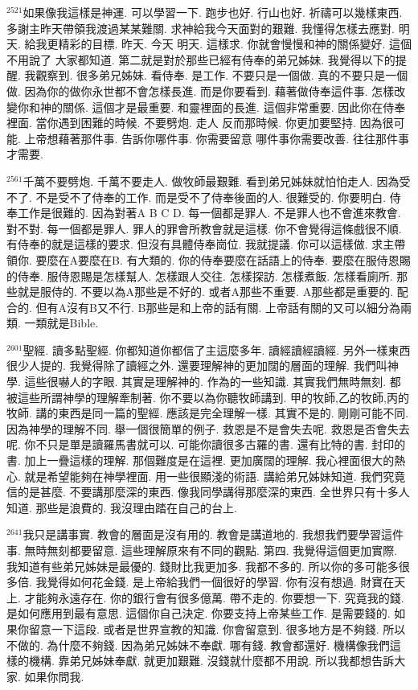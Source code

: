 \documentclass{book}
\begin{document}
$^{2521}$如果像我這樣是神運.
可以學習一下.
跑步也好.
行山也好.
祈禱可以幾樣東西.
多謝主昨天帶領我渡過某某難關.
求神給我今天面對的艱難.
我懂得怎樣去應對.
明天.
給我更精彩的目標.
昨天.
今天 明天.
這樣求.
你就會慢慢和神的關係變好.
這個不用說了 大家都知道.
第二就是對於那些已經有侍奉的弟兄姊妹.
我覺得以下的提醒.
我觀察到.
很多弟兄姊妹.
看侍奉.
是工作.
不要只是一個做.
真的不要只是一個做.
因為你的做你永世都不會怎樣長進.
而是你要看到.
藉著做侍奉這件事.
怎樣改變你和神的關係.
這個才是最重要.
和靈裡面的長進.
這個非常重要.
因此你在侍奉裡面.
當你遇到困難的時候.
不要劈炮.
走人 反而那時候.
你更加要堅持.
因為很可能.
上帝想藉著那件事.
告訴你哪件事.
你需要留意 哪件事你需要改善.
往往那件事才需要.

$^{2561}$千萬不要劈炮.
千萬不要走人.
做牧師最艱難.
看到弟兄姊妹就怕怕走人.
因為受不了.
不是受不了侍奉的工作.
而是受不了侍奉後面的人.
很難受的.
你要明白.
侍奉工作是很難的.
因為對著A B C D.
每一個都是罪人.
不是罪人也不會進來教會.
對不對.
每一個都是罪人.
罪人的罪會所教會就是這樣.
你不會覺得這條戲很不順.
有侍奉的就是這樣的要求.
但沒有具體侍奉崗位.
我就提議.
你可以這樣做.
求主帶領你.
要麼在A要麼在B.
有大類的.
你的侍奉要麼在話語上的侍奉.
要麼在服侍恩賜的侍奉.
服侍恩賜是怎樣幫人.
怎樣跟人交往.
怎樣探訪.
怎樣煮飯.
怎樣看廁所.
那些就是服侍的.
不要以為A那些是不好的.
或者A那些不重要.
A那些都是重要的.
配合的.
但有A沒有B又不行.
B那些是和上帝的話有關.
上帝話有關的又可以細分為兩類.
一類就是Bible.

$^{2601}$聖經.
讀多點聖經.
你都知道你都信了主這麼多年.
讀經讀經讀經.
另外一樣東西很少人提的.
我覺得除了讀經之外.
還要理解神的更加闊的層面的理解.
我們叫神學.
這些很嚇人的字眼.
其實是理解神的.
作為的一些知識.
其實我們無時無刻.
都被這些所謂神學的理解牽制著.
你不要以為你聽牧師講到.
甲的牧師,乙的牧師,丙的牧師.
講的東西是同一篇的聖經.
應該是完全理解一樣.
其實不是的.
剛剛可能不同.
因為神學的理解不同.
舉一個很簡單的例子.
救恩是不是會失去呢.
救恩是否會失去呢.
你不只是單是讀羅馬書就可以.
可能你讀很多古羅的書.
還有比特的書.
封印的書.
加上一疊這樣的理解.
那個難度是在這裡.
更加廣闊的理解.
我心裡面很大的熱心.
就是希望能夠在神學裡面.
用一些很顯淺的術語.
講給弟兄姊妹知道.
我們究竟信的是甚麼.
不要講那麼深的東西.
像我同學講得那麼深的東西.
全世界只有十多人知道.
那些是浪費的.
我沒理由踏在自己的台上.

$^{2641}$我只是講事實.
教會的層面是沒有用的.
教會是講道地的.
我想我們要學習這件事.
無時無刻都要留意.
這些理解原來有不同的觀點.
第四.
我覺得這個更加實際.
我知道有些弟兄姊妹是最優的.
錢財比我更加多.
我都不多的.
所以你的多可能多很多倍.
我覺得如何花金錢.
是上帝給我們一個很好的學習.
你有沒有想過.
財寶在天上.
才能夠永遠存在.
你的銀行會有很多億萬.
帶不走的.
你要想一下.
究竟我的錢.
是如何應用到最有意思.
這個你自己決定.
你要支持上帝某些工作.
是需要錢的.
如果你留意一下這段.
或者是世界宣教的知識.
你會留意到.
很多地方是不夠錢.
所以不做的.
為什麼不夠錢.
因為弟兄姊妹不奉獻.
哪有錢.
教會都還好.
機構像我們這樣的機構.
靠弟兄姊妹奉獻.
就更加艱難.
沒錢就什麼都不用說.
所以我都想告訴大家.
如果你問我.
\end{document}
